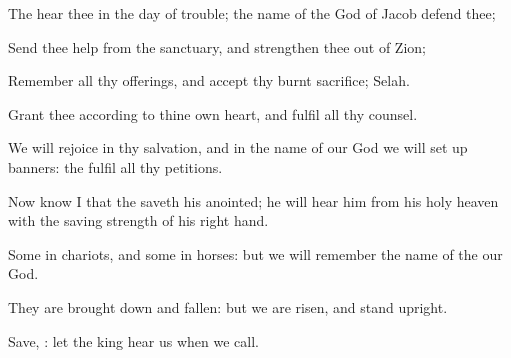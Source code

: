 {\Q {}The
{}
hear thee in the
day of
trouble; the
name of the
God of
Jacob
defend thee;


\par }{\Q {}Send thee
help from the
sanctuary, and
strengthen thee out of
Zion;


\par }{\Q {}Remember all thy
offerings, and
accept thy burnt
sacrifice;
Selah.


\par }{\Q {}Grant thee according to thine own
heart, and
fulfil all thy
counsel.


\par }{\Q {}We will
rejoice in thy
salvation, and in the
name of our
God we will set up
{}
banners: the
{}
fulfil all thy
petitions.


\par }{\BB \par }
{\Q {}Now
know I that the
{}
saveth his
anointed; he will
hear him from his
holy
heaven with the
saving
strength of his right
hand.


\par }{\Q {}Some
{} in
chariots, and some in
horses: but we will
remember the
name of the
{} our
God.


\par }{\Q {}They are brought
down and
fallen: but we are
risen, and stand
upright.


\par }{\Q {}Save,
{}: let the
king
hear us
when we
call.




\par }
